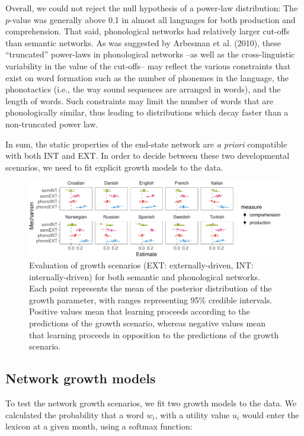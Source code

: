 \documentclass[english,floatsintext,man]{apa6}
\theoremstyle{definition}
\theoremstyle{definition}
\theoremstyle{definition}
\theoremstyle{remark}
\begin{document}
Overall, we could not reject the null hypothesis of a power-law
distribution: The \(p\)-value was generally above 0.1 in almost all
languages for both production and comprehension. That said, phonological
networks had relatively larger cut-offs than semantic networks. As was
suggested by Arbesman et al. (2010), these \enquote{truncated}
power-laws in phonological networks --as well as the cross-linguistic
variability in the value of the cut-offs-- may reflect the various
constraints that exist on word formation such as the number of phonemes
in the language, the phonotactics (i.e., the way sound sequences are
arranged in words), and the length of words. Such constraints may limit
the number of words that are phonologically similar, thus leading to
distributions which decay faster than a non-truncated power law.

In sum, the static properties of the end-state network are \emph{a
priori} compatible with both INT and EXT. In order to decide between
these two developmental scenarios, we need to fit explicit growth models
to the data.

\begin{figure}[!h]
\includegraphics[width=\textwidth]{ms_files/figure-latex/growthPred-1} \caption{Evaluation of growth scenarios (EXT: externally-driven, INT: internally-driven) for both semantic and phonological networks. Each point represents the mean of the posterior distribution of the growth parameter, with ranges representing 95\% credible intervals. Positive values mean that learning proceeds according to the predictions of the growth scenario, whereas negative values mean that learning proceeds in opposition to the predictions of the growth scenario.}\label{fig:growthPred}
\end{figure}

\subsection{Network growth models}\label{network-growth-models}

To test the network growth scenarios, we fit two growth models to the
data. We calculated the probability that a word \(w_i\), with a utility
value \(u_i\) would enter the lexicon at a given month, using a softmax
function:
\end{document}
